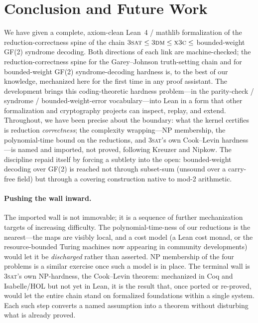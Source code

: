 \documentclass[a4paper,UKenglish,cleveref,autoref]{lipics-v2021}
\begin{document}
\section{Conclusion and Future Work}\label{sec:concl}

We have given a complete, axiom-clean Lean~4 / mathlib formalization of the reduction-correctness spine of the
chain $\textsc{3sat} \le \textsc{3dm} \le \textsc{x3c} \le$ bounded-weight GF(2) syndrome decoding. Both
directions of each link are machine-checked; the reduction-correctness spine for the Garey--Johnson
truth-setting chain and for bounded-weight GF(2) syndrome-decoding hardness is, to the best of our knowledge,
mechanized here for the first time in any proof assistant. The development brings this coding-theoretic hardness
problem---in the parity-check / syndrome / bounded-weight-error vocabulary---into Lean in a form that other
formalization and cryptography projects can inspect, replay, and extend. Throughout, we have been precise about
the boundary: what the kernel certifies is reduction \emph{correctness}; the complexity wrapping---NP
membership, the polynomial-time bound on the reductions, and \textsc{3sat}'s own Cook--Levin hardness---is named
and imported, not proved, following Kreuzer and Nipkow. The discipline repaid itself by forcing a subtlety into
the open: bounded-weight decoding over GF(2) is reached not through subset-sum (unsound over a carry-free field)
but through a covering construction native to mod-2 arithmetic.

\paragraph*{Pushing the wall inward.} The imported wall is not immovable; it is a sequence of further
mechanization targets of increasing difficulty. The polynomial-time-ness of our reductions is the nearest---the
maps are visibly local, and a cost model (a Lean cost monad, or the resource-bounded Turing machines now
appearing in community developments) would let it be \emph{discharged} rather than asserted. NP membership of
the four problems is a similar exercise once such a model is in place. The terminal wall is \textsc{3sat}'s own
NP-hardness, the Cook--Levin theorem: mechanized in Coq and Isabelle/HOL but not yet in Lean, it is the result
that, once ported or re-proved, would let the entire chain stand on formalized foundations within a single
system. Each such step converts a named assumption into a theorem without disturbing what is already proved.
\end{document}
